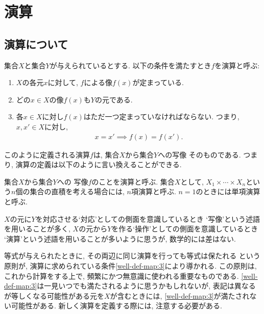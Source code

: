 
\newcommand{\tofu}{{\bullet}}
\newcommand{\lxor}{\oplus}

\chapter{演算}
\section{演算について}
集合$X$と集合$Y$が与えられているとする.
以下の条件を満たすとき$f$を演算と呼ぶ:
\begin{enumerate}
 \item 
 \label{well-def-map:1}
 $X$の各元$x$に対して, $f$による像$f(x)$が定まっている.
 \item 
 \label{well-def-map:2}
 どの$x\in X$の像$f(x)$も$Y$の元である.
 \item 
\label{well-def-map:3}
各$x\in X$に対し$f(x)$はただ一つ定まっていなければならない.
つまり, $x,x'\in X$に対し,
 \begin{align*}
  x=x'\implies f(x)=f(x').
 \end{align*}
\end{enumerate}
このように定義される演算$f$は,
集合$X$から集合$Y$への写像
そのものである.
つまり, 演算の定義は以下のように言い換えることができる.
\begin{definition}
集合$X$から集合$Y$への
写像$f$のことを演算と呼ぶ.
集合$X$として, $X_1\times \cdots \times X_n$という$n$個の集合の直積を考える場合には,
$n$項演算と呼ぶ.
$n=1$のときには単項演算と呼ぶ.
\end{definition}
$X$の元に$Y$を対応させる`対応'としての側面を意識しているとき
`写像'という述語を用いることが多く,
$X$の元から$Y$を作る`操作'としての側面を意識しているとき
`演算'という述語を用いることが多いように思うが,
数学的には差はない.

等式が与えられたときに,
その両辺に同じ演算を行っても等式は保たれる
という原則が,
演算に求められている条件\cref{well-def-map:3}により導かれる.
この原則は,
これから計算をする上で,
頻繁にかつ無意識に使われる重要なものである.
\cref{well-def-map:3}は一見いつでも満たされるように思うかもしれないが,
表記は異なるが等しくなる可能性がある元を$X$が含むときには,
\cref{well-def-map:3}が満たされない可能性がある.
新しく演算を定義する際には,
注意する必要がある.

